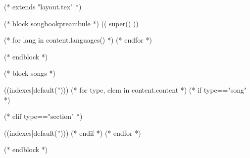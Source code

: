

(* extends "layout.tex" *)

(* block songbookpreambule *)
   (( super() ))


   (* for lang in content.languages() *)
   (* endfor *)
   \usepackage[((lang))]{babel}

   \graphicspath{{((datadir))/img/}}
(* endblock *)

(* block songs *)

   \begin{songs}{((indexes|default('')))}
      (* for type, elem in content.content *)
      (* if type=="song" *)
        
      (* elif type=="section" *)
        \end{songs}
        \begin{songs}{((indexes|default('')))}
      (* endif *)
      (* endfor *)
   \end{songs}
(* endblock *)
